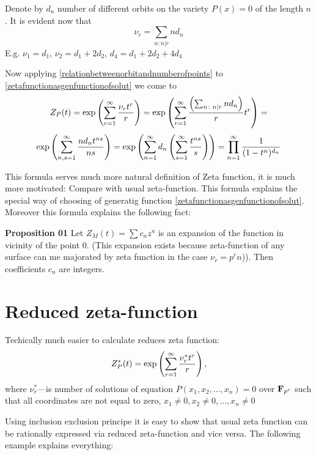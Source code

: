 \documentclass[12pt]{article}
\theoremstyle{theorem}
\numberwithin{equation}{section}
\begin{document}
  Denote by $d_n$ number of different orbits on the variety $P(x)=0$ of the length $n$. It is evident now that
   \begin{equation}\label{relationbetweenorbitandnumberofpoints}
    \nu_r=\sum_{n\colon n|r} nd_n
\end{equation}
 E.g. $\nu_1=d_1$, $\nu_2=d_1+2d_2$, $d_4=d_1+2d_2+4d_4$

Now applying \eqref{relationbetweenorbitandnumberofpoints} to \eqref{zetafunctionasgenfunctionofsolut} we come to
                 $$
                Z_P(t)=\exp\left(\sum_{r=1}^\infty {\nu_rt^r\over r}\right)=
        \exp\left(\sum_{r=1}^\infty {\left(\sum_{n\colon n|r} nd_n\right)\over r}t^r\right)=
                 $$
\begin{equation}\label{zetafunctionmorenatural}
  \exp\left(\sum_{n,s=1}^\infty{nd_nt^{ns}\over ns}\right)=
  \exp\left(\sum_{n=1}^\infty d_n\left(\sum_{s=1}^\infty{t^{ns}\over s}\right)\right)=
  \prod_{n=1}^\infty{1\over (1-t^n)^{d_n}}
\end{equation}


This formula serves much more natural definition of Zeta function, it is much more motivated:
Compare with usual zeta-function.
This formula explains the special way of choosing of generatig function \eqref{zetafunctionasgenfunctionofsolut}.
Moreover this formula explains the following fact:


  {\bf Proposition 01} Let $Z_M(t)=\sum c_nz^n$ is an expansion of the function in vicinity of the point
  $0$. (This expansion exists because zeta-function of any surface can me majorated by zeta
  function in the case $\nu_r=p^rn$)).
   Then coefficients $c_n$ are integers.


\section {Reduced zeta-function}

  Techically much easier to calculate reduces zeta function:
  \begin{equation}\label{zetafunctionreduced}
        Z^*_P(t)=\exp\left(\sum_{r=1}^\infty {\nu^*_rt^r\over
        r}\right),
          \end{equation}
where $\nu_r^*$---is number of solutions of equation $P(x_1,x_2,\dots,x_n)=0$ over ${\bf F}_{p^r}$ such that all
coordinates are not equal to zero, $x_1\not=0,x_2\not=0,\dots,x_n\not=0$

Using inclusion exclusion principe it is easy to show that usual zeta function can be rationally expressed
via reduced zeta-function and vice versa.
The following example explains everything:
\end{document}
